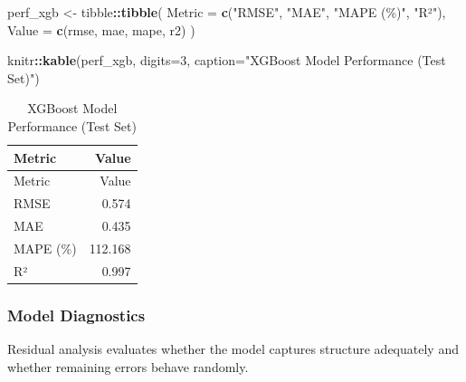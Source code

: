 \documentclass[
]{article}
\newenvironment{Shaded}{\begin{snugshade}}{\end{snugshade}}
\newcommand{\AttributeTok}[1]{\textcolor[rgb]{0.13,0.29,0.53}{#1}}
\newcommand{\DecValTok}[1]{\textcolor[rgb]{0.00,0.00,0.81}{#1}}
\newcommand{\FunctionTok}[1]{\textcolor[rgb]{0.13,0.29,0.53}{\textbf{#1}}}
\newcommand{\NormalTok}[1]{#1}
\newcommand{\OtherTok}[1]{\textcolor[rgb]{0.56,0.35,0.01}{#1}}
\newcommand{\SpecialCharTok}[1]{\textcolor[rgb]{0.81,0.36,0.00}{\textbf{#1}}}
\newcommand{\StringTok}[1]{\textcolor[rgb]{0.31,0.60,0.02}{#1}}
\begin{document}
\begin{Shaded}
\begin{Highlighting}[]
\NormalTok{perf\_xgb }\OtherTok{\textless{}{-}}\NormalTok{ tibble}\SpecialCharTok{::}\FunctionTok{tibble}\NormalTok{(}
  \AttributeTok{Metric =} \FunctionTok{c}\NormalTok{(}\StringTok{"RMSE"}\NormalTok{, }\StringTok{"MAE"}\NormalTok{, }\StringTok{"MAPE (\%)"}\NormalTok{, }\StringTok{"R²"}\NormalTok{),}
  \AttributeTok{Value  =} \FunctionTok{c}\NormalTok{(rmse, mae, mape, r2)}
\NormalTok{)}

\NormalTok{knitr}\SpecialCharTok{::}\FunctionTok{kable}\NormalTok{(perf\_xgb, }\AttributeTok{digits=}\DecValTok{3}\NormalTok{, }\AttributeTok{caption=}\StringTok{"XGBoost Model Performance (Test Set)"}\NormalTok{)}
\end{Highlighting}
\end{Shaded}

\begin{longtable}[]{@{}lr@{}}
\caption{XGBoost Model Performance (Test Set)}\tabularnewline
\toprule\noalign{}
Metric & Value \\
\midrule\noalign{}
\endfirsthead
\toprule\noalign{}
Metric & Value \\
\midrule\noalign{}
\endhead
\bottomrule\noalign{}
\endlastfoot
RMSE & 0.574 \\
MAE & 0.435 \\
MAPE (\%) & 112.168 \\
R² & 0.997 \\
\end{longtable}

\subsubsection{Model Diagnostics}\label{model-diagnostics-1}

Residual analysis evaluates whether the model captures structure
adequately and whether remaining errors behave randomly.
\end{document}
